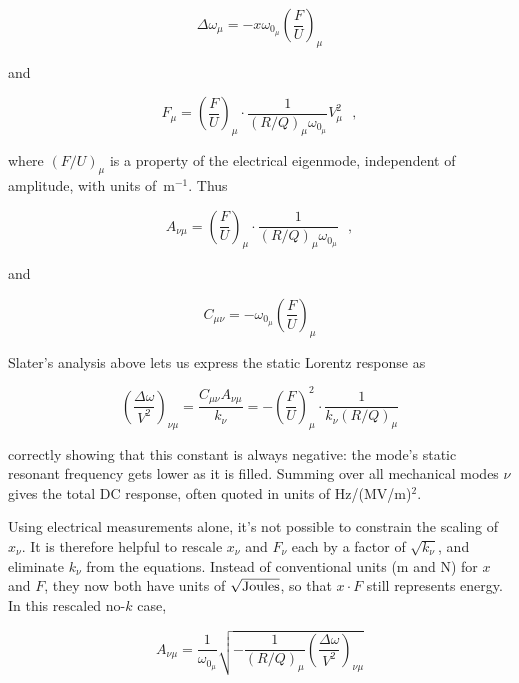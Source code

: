 \documentclass[a4paper,12pt]{article}
\begin{document}
\begin{equation}
\Delta\omega_{\mu} = -x\omega_{0_{\mu}} \left(\frac{F}{U}\right)_{\mu}
\end{equation}

\noindent and

\begin{equation}
F_{\mu} = \left(\frac{F}{U}\right)_{\mu} \cdot \frac{1}{(R/Q)_{\mu}\omega_{0_{\mu}}}  V_{\mu}^2~~~,
\end{equation}

\noindent where $\left(F/U\right)_{\mu}$ is a property of the electrical eigenmode, independent of amplitude, with units of~\hbox{m$^{-1}$}. Thus 

\begin{equation}
A_{\nu\mu} = \left(\frac{F}{U}\right)_{\mu} \cdot \frac{1}{(R/Q)_{\mu}\omega_{0_{\mu}}}~~~,
\end{equation}

\noindent and 

\begin{equation}
C_{\mu\nu} = -\omega_{0_{\mu}} \left(\frac{F}{U}\right)_{\mu}
\end{equation}

Slater's analysis above lets us express the static Lorentz response as

\begin{equation}
 \left(\frac{\Delta \omega}{ V^2}\right)_{\nu \mu} = \frac{C_{\mu\nu} A_{\nu\mu}}{ k_\nu} = - \left(\frac{F}{U}\right)_{\mu}^2 \cdot \frac{1}{k_\nu (R/Q)_{\mu}}
\end{equation}

\noindent correctly showing that this constant is always negative: the mode's static resonant frequency gets lower as it is filled. Summing over all mechanical modes $\nu$ gives the total DC response, often quoted in units of \hbox{Hz/(MV/m)$^2$}.

Using electrical measurements alone, it's not possible to constrain the scaling of $x_\nu$. It is therefore helpful to rescale $x_\nu$ and $F_\nu$ each by a factor of $\sqrt{k_\nu}$, and eliminate $k_\nu$ from the equations.  Instead of conventional units (m and N) for $x$ and $F$, they now both have units of $\sqrt{\rm Joules}$, so that $x\cdot F$ still represents energy. In this rescaled no-$k$ case,

\begin{equation}
A_{\nu\mu} = \frac{1}{ \omega_{0_{\mu}}} \sqrt{-\frac{1}{ (R/Q)_{\mu}}  \left(\frac{\Delta \omega}{ V^2}\right)_{\nu \mu}}
\end{equation}
\end{document}
